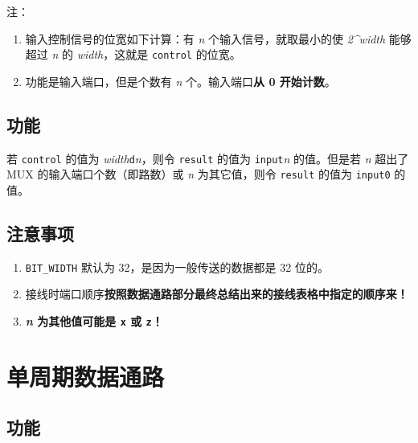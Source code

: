 \documentclass[12pt,AutoFakeBold]{article}
\providecommand{\tightlist}{%
  \setlength{\itemsep}{0pt}\setlength{\parskip}{0pt}}
\begin{document}
注：

\begin{enumerate}
\def\labelenumi{\arabic{enumi}.}
\tightlist
\item
  输入控制信号的位宽如下计算：有 \emph{n} 个输入信号，就取最小的使
  \emph{2\^{}width} 能够超过 \emph{n} 的 \emph{width}，这就是
  \texttt{control} 的位宽。
\item
  功能是输入端口，但是个数有 \emph{n} 个。输入端口\textbf{从 0
  开始计数}。
\end{enumerate}

\hypertarget{ux529fux80fd-10}{%
\subsection{功能}\label{ux529fux80fd-10}}

若 \texttt{control} 的值为
\emph{width}\texttt{\textquotesingle{}d}\emph{n}，则令 \texttt{result}
的值为 \texttt{input}\emph{n} 的值。但是若 \emph{n} 超出了 MUX
的输入端口个数（即路数）或 \emph{n} 为其它值，则令 \texttt{result}
的值为 \texttt{input0} 的值。

\hypertarget{ux6ce8ux610fux4e8bux9879-6}{%
\subsection{注意事项}\label{ux6ce8ux610fux4e8bux9879-6}}

\begin{enumerate}
\def\labelenumi{\arabic{enumi}.}
\tightlist
\item
  \texttt{BIT\_WIDTH} 默认为 32，是因为一般传送的数据都是 32 位的。
\item
  接线时端口顺序\textbf{按照数据通路部分最终总结出来的接线表格中指定的顺序来！}
\item
  \textbf{\emph{n} 为其他值可能是 \texttt{x} 或 \texttt{z}！}
\end{enumerate}

\hypertarget{ux5355ux5468ux671fux6570ux636eux901aux8def}{%
\section{单周期数据通路}\label{ux5355ux5468ux671fux6570ux636eux901aux8def}}

\hypertarget{ux529fux80fd-11}{%
\subsection{功能}\label{ux529fux80fd-11}}
\end{document}
